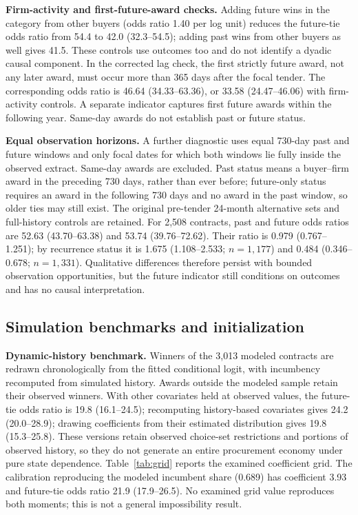 \documentclass[11pt,a4paper]{article}
\begin{document}
\textbf{Firm-activity and first-future-award checks.} Adding future wins in the category from other buyers (odds ratio 1.40 per log unit) reduces the future-tie odds ratio from 54.4 to 42.0 (32.3--54.5); adding past wins from other buyers as well gives 41.5. These controls use outcomes too and do not identify a dyadic causal component. In the corrected lag check, the first strictly future award, not any later award, must occur more than 365 days after the focal tender. The corresponding odds ratio is 46.64 (34.33--63.36), or 33.58 (24.47--46.06) with firm-activity controls. A separate indicator captures first future awards within the following year. Same-day awards do not establish past or future status.

\textbf{Equal observation horizons.} A further diagnostic uses equal 730-day past and future windows and only focal dates for which both windows lie fully inside the observed extract. Same-day awards are excluded. Past status means a buyer--firm award in the preceding 730 days, rather than ever before; future-only status requires an award in the following 730 days and no award in the past window, so older ties may still exist. The original pre-tender 24-month alternative sets and full-history controls are retained. For 2,508 contracts, past and future odds ratios are 52.63 (43.70--63.38) and 53.74 (39.76--72.62). Their ratio is 0.979 (0.767--1.251); by recurrence status it is 1.675 (1.108--2.533; $n=1,177$) and 0.484 (0.346--0.678; $n=1,331$). Qualitative differences therefore persist with bounded observation opportunities, but the future indicator still conditions on outcomes and has no causal interpretation.

\subsection{Simulation benchmarks and initialization}
\textbf{Dynamic-history benchmark.} Winners of the 3,013 modeled contracts are redrawn chronologically from the fitted conditional logit, with incumbency recomputed from simulated history. Awards outside the modeled sample retain their observed winners. With other covariates held at observed values, the future-tie odds ratio is 19.8 (16.1--24.5); recomputing history-based covariates gives 24.2 (20.0--28.9); drawing coefficients from their estimated distribution gives 19.8 (15.3--25.8). These versions retain observed choice-set restrictions and portions of observed history, so they do not generate an entire procurement economy under pure state dependence. Table~\ref{tab:grid} reports the examined coefficient grid. The calibration reproducing the modeled incumbent share (0.689) has coefficient 3.93 and future-tie odds ratio 21.9 (17.9--26.5). No examined grid value reproduces both moments; this is not a general impossibility result.
\end{document}
